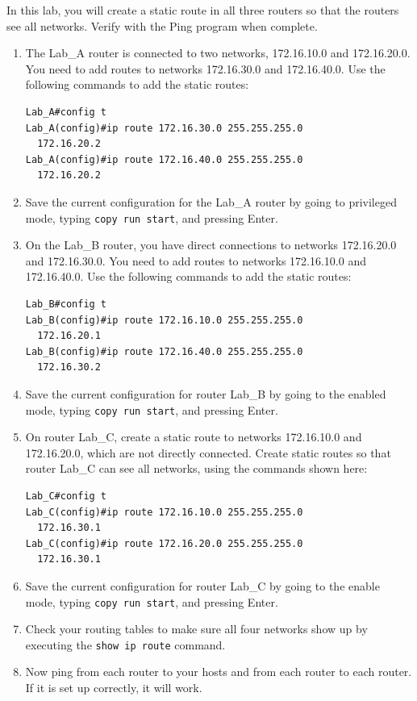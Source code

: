 In this lab, you will create a static route in all three routers so that
the routers see all networks. Verify with the Ping program when
complete.

\begin{enumerate}
\item
  The Lab\_A router is connected to two networks, 172.16.10.0 and
  172.16.20.0. You need to add routes to networks 172.16.30.0 and
  172.16.40.0. Use the following commands to add the static routes:

\begin{verbatim}
Lab_A#config t
Lab_A(config)#ip route 172.16.30.0 255.255.255.0
  172.16.20.2
Lab_A(config)#ip route 172.16.40.0 255.255.255.0
  172.16.20.2
\end{verbatim}
\item
  Save the current configuration for the Lab\_A router by going to
  privileged mode, typing \texttt{copy\ run\ start}, and pressing Enter.
\item
  On the Lab\_B router, you have direct connections to networks
  172.16.20.0 and 172.16.30.0. You need to add routes to networks
  172.16.10.0 and 172.16.40.0. Use the following commands to add the
  static routes:

\begin{verbatim}
Lab_B#config t
Lab_B(config)#ip route 172.16.10.0 255.255.255.0
  172.16.20.1
Lab_B(config)#ip route 172.16.40.0 255.255.255.0
  172.16.30.2
\end{verbatim}
\item
  Save the current configuration for router Lab\_B by going to the
  enabled mode, typing \texttt{copy\ run\ start}, and pressing Enter.
\item
  On router Lab\_C, create a static route to networks 172.16.10.0 and
  172.16.20.0, which are not directly connected. Create static routes so
  that router Lab\_C can see all networks, using the commands shown
  here:

\begin{verbatim}
Lab_C#config t
Lab_C(config)#ip route 172.16.10.0 255.255.255.0
  172.16.30.1
Lab_C(config)#ip route 172.16.20.0 255.255.255.0
  172.16.30.1
\end{verbatim}
\item
  Save the current configuration for router Lab\_C by going to the
  enable mode, typing \texttt{copy\ run\ start}, and pressing Enter.
\item
  \protect\hypertarget{c09.xhtmlux5cux23Page_403}{}{}Check your routing
  tables to make sure all four networks show up by executing the
  \texttt{show\ ip\ route} command.
\item
  Now ping from each router to your hosts and from each router to each
  router. If it is set up correctly, it will work.
\end{enumerate}

